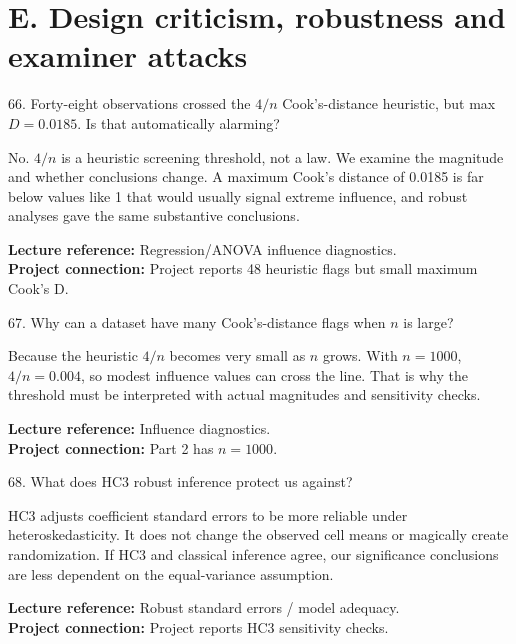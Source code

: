 \documentclass[10.5pt,a4paper]{article}
\newcommand{\chapref}[1]{\textbf{Lecture reference:} #1}
\newcommand{\projectref}[1]{\textbf{Project connection:} #1}
\begin{document}
\section*{E. Design criticism, robustness and examiner attacks}
\begin{qbox}{66. Forty-eight observations crossed the $4/n$ Cook's-distance heuristic, but max $D=0.0185$. Is that automatically alarming?}
\end{qbox}
\begin{answerbox}No. \(4/n\) is a heuristic screening threshold, not a law. We examine the magnitude and whether conclusions change. A maximum Cook's distance of 0.0185 is far below values like 1 that would usually signal extreme influence, and robust analyses gave the same substantive conclusions.\end{answerbox}
\begin{refbox}\chapref{Regression/ANOVA influence diagnostics.}\\\projectref{Project reports 48 heuristic flags but small maximum Cook's D.}\end{refbox}
\begin{qbox}{67. Why can a dataset have many Cook's-distance flags when $n$ is large?}
\end{qbox}
\begin{answerbox}Because the heuristic \(4/n\) becomes very small as \(n\) grows. With \(n=1000\), \(4/n=0.004\), so modest influence values can cross the line. That is why the threshold must be interpreted with actual magnitudes and sensitivity checks.\end{answerbox}
\begin{refbox}\chapref{Influence diagnostics.}\\\projectref{Part 2 has $n=1000$.}\end{refbox}
\begin{qbox}{68. What does HC3 robust inference protect us against?}
\end{qbox}
\begin{answerbox}HC3 adjusts coefficient standard errors to be more reliable under heteroskedasticity. It does not change the observed cell means or magically create randomization. If HC3 and classical inference agree, our significance conclusions are less dependent on the equal-variance assumption.\end{answerbox}
\begin{refbox}\chapref{Robust standard errors / model adequacy.}\\\projectref{Project reports HC3 sensitivity checks.}\end{refbox}
\end{document}
